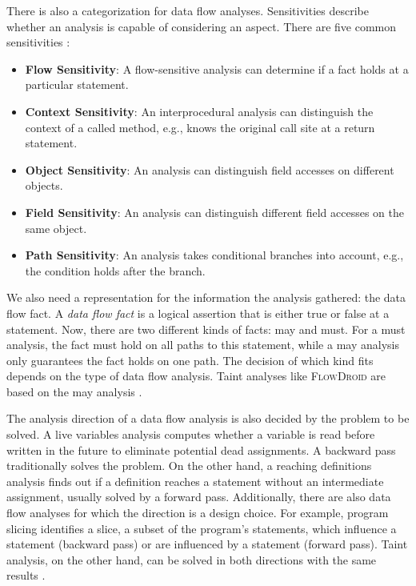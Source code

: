 \documentclass[../draft.tex]{subfiles}
\begin{document}
    There is also a categorization for data flow analyses. 
    Sensitivities describe whether an analysis is capable of considering an aspect. 
    There are five common sensitivities \cite{Khedker2009,Arzt2017PhD}:
    \begin{itemize}
        \item \textbf{Flow Sensitivity}: A flow-sensitive analysis can determine if a fact holds at a particular statement.
        \item \textbf{Context Sensitivity}: An interprocedural analysis can distinguish the context of a called method, e.g., knows the original call site at a return statement.
        \item \textbf{Object Sensitivity}: An analysis can distinguish field accesses on different objects.
        \item \textbf{Field Sensitivity}: An analysis can distinguish different field accesses on the same object.
        \item \textbf{Path Sensitivity}: An analysis takes conditional branches into account, e.g., the condition holds after the branch.
    \end{itemize}

    We also need a representation for the information the analysis gathered: the data flow fact. 
    A \textit{data flow fact} is a logical assertion that is either true or false at a statement. 
    Now, there are two different kinds of facts: may and must. 
    For a must analysis, the fact must hold on all paths to this statement, while a may analysis only guarantees the fact holds on one path. 
    The decision of which kind fits depends on the type of data flow analysis. 
    Taint analyses like \textsc{FlowDroid} are based on the may analysis \cite{Arzt2017PhD}.

    The analysis direction of a data flow analysis is also decided by the problem to be solved. 
    A live variables analysis computes whether a variable is read before written in the future to eliminate potential dead assignments. 
    A backward pass traditionally solves the problem. 
    On the other hand, a reaching definitions analysis finds out if a definition reaches a statement without an intermediate assignment, usually solved by a forward pass.
    Additionally, there are also data flow analyses for which the direction is a design choice.
    For example, program slicing identifies a slice, a subset of the program's statements, which influence a statement (backward pass) or are influenced by a statement (forward pass).
    Taint analysis, on the other hand, can be solved in both directions with the same results \cite{Khedker2009}.
    
\end{document}
